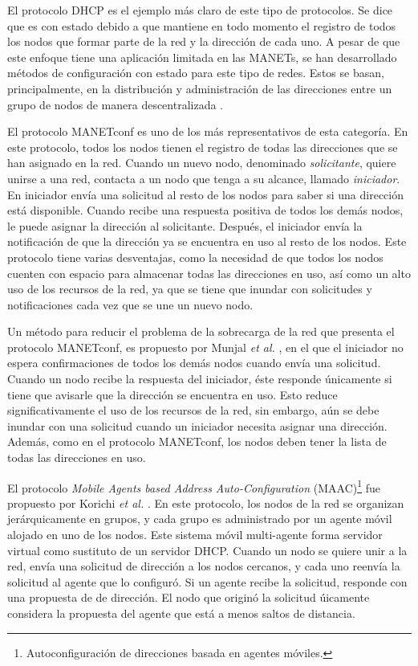 El protocolo DHCP es el ejemplo más claro de este tipo de protocolos. Se dice
que es con estado debido a que mantiene en todo momento el registro de todos los
nodos que formar parte de la red y la dirección de cada uno. A pesar de que este
enfoque tiene una aplicación limitada en las MANETs, se han desarrollado
métodos de configuración con estado para este tipo de redes. Estos se basan,
principalmente, en la distribución y administración de las direcciones entre un
grupo de nodos de manera descentralizada \cite{Grajzer2019}.

El protocolo MANETconf \cite{Nesargi2002} es uno de los más representativos de
esta categoría. En este protocolo, todos los nodos tienen el registro de todas
las direcciones que se han asignado en la red. Cuando un nuevo nodo, denominado
\textit{solicitante}, quiere unirse a una red, contacta a un nodo que tenga a su
alcance, llamado \textit{iniciador}. En iniciador envía una solicitud al resto
de los nodos para saber si una dirección está disponible. Cuando recibe una
respuesta positiva de todos los demás nodos, le puede asignar la dirección al
solicitante. Después, el iniciador envía la notificación de que la dirección ya
se encuentra en uso al resto de los nodos. Este protocolo tiene varias
desventajas, como la necesidad de que todos los nodos cuenten con espacio para
almacenar todas las direcciones en uso, así como un alto uso de los recursos de
la red, ya que se tiene que inundar con solicitudes y notificaciones cada vez
que se une un nuevo nodo.

Un método para reducir el problema de la sobrecarga de la red que presenta el
protocolo MANETconf, es propuesto por Munjal \textit{et al.} \cite{Munjal2014},
en el que el iniciador no espera confirmaciones de todos los demás nodos cuando
envía una solicitud. Cuando un nodo recibe la respuesta del iniciador, éste
responde únicamente si tiene que avisarle que la dirección se encuentra en uso.
Esto reduce significativamente el uso de los recursos de la red, sin embargo,
aún se debe inundar con una solicitud cuando un iniciador necesita asignar una
dirección. Además, como en el protocolo MANETconf, los nodos deben tener la
lista de todas las direcciones en uso.

El protocolo \textit{Mobile Agents based Address Auto-Configuration}
(MAAC)\footnote{Autoconfiguración de direcciones basada en agentes móviles.} fue
propuesto por Korichi \textit{et al.} \cite{Korichi2018}. En este protocolo,
los nodos de la red se organizan jerárquicamente en grupos, y cada grupo es
administrado por un agente móvil alojado en uno de los nodos. Este sistema
móvil multi-agente forma servidor virtual como sustituto de un servidor DHCP.
Cuando un nodo se quiere unir a la red, envía una solicitud de dirección a los
nodos cercanos, y cada uno reenvía la solicitud al agente que lo configuró. Si
un agente recibe la solicitud, responde con una propuesta de de dirección. El
nodo que originó la solicitud úicamente considera la propuesta del agente que
está a menos saltos de distancia.

